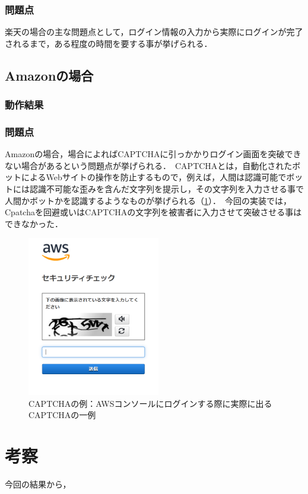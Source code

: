 \documentclass[dvipdfmx]{jsarticle}
\begin{document}
                \subsubsection{問題点}
                    楽天の場合の主な問題点として，ログイン情報の入力から実際にログインが完了されるまで，ある程度の時間を要する事が挙げられる．\
                    
            \subsection{Amazonの場合}
                \subsubsection{動作結果}
                \subsubsection{問題点}
                    Amazonの場合，場合によればCAPTCHAに引っかかりログイン画面を突破できない場合があるという問題点が挙げられる．\
                    CAPTCHAとは，自動化されたボットによるWebサイトの操作を防止するもので，例えば，人間は認識可能でボットには認識不可能な歪みを含んだ文字列を提示し，その文字列を入力させる事で人間かボットかを認識するようなものが挙げられる（\ref{captcha}）．\
                    今回の実装では，Cpatchaを回避或いはCAPTCHAの文字列を被害者に入力させて突破させる事はできなかった．\
                    \begin{figure}[ht]
                        \centering
                        \includegraphics[height=7cm]{img/captcha.png}
                        \caption{CAPTCHAの例：AWSコンソールにログインする際に実際に出るCAPTCHAの一例}
                        \label{captcha}
                    \end{figure}
        \section{考察}
            今回の結果から，
\end{document}
